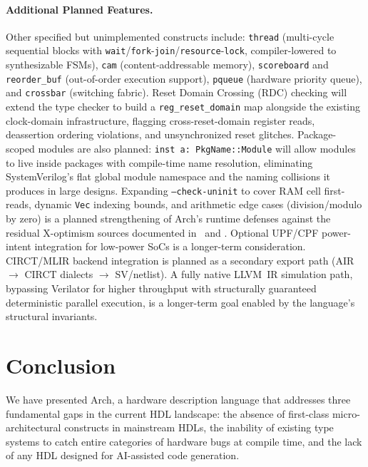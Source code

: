 \documentclass[11pt,twocolumn]{article}
\begin{document}
\paragraph{Additional Planned Features.}
Other specified but unimplemented constructs include:
\texttt{thread} (multi-cycle sequential blocks with \texttt{wait}/\texttt{fork}-\texttt{join}/\texttt{resource}-\texttt{lock}, compiler-lowered to synthesizable FSMs),
\texttt{cam} (content-addressable memory),
\texttt{scoreboard} and \texttt{reorder\_buf} (out-of-order execution support),
\texttt{pqueue} (hardware priority queue),
and \texttt{crossbar} (switching fabric).
Reset Domain Crossing (RDC) checking will extend the type checker to build a \texttt{reg\_reset\_domain} map alongside the existing clock-domain infrastructure, flagging cross-reset-domain register reads, deassertion ordering violations, and unsynchronized reset glitches.
Package-scoped modules are also planned: \texttt{inst a: PkgName::Module} will allow modules to live inside packages with compile-time name resolution, eliminating SystemVerilog's flat global module namespace and the naming collisions it produces in large designs.
Expanding \texttt{--check-uninit} to cover RAM cell first-reads, dynamic \texttt{Vec} indexing bounds, and arithmetic edge cases (division/modulo by zero) is a planned strengthening of Arch's runtime defenses against the residual X-optimism sources documented in~\cite{zhao2014xoptimism} and . Optional UPF/CPF power-intent integration for low-power SoCs is a longer-term consideration.
CIRCT/MLIR backend integration is planned as a secondary export path (AIR $\to$ CIRCT dialects $\to$ SV/netlist).
A fully native LLVM~IR simulation path, bypassing Verilator for higher throughput with structurally guaranteed deterministic parallel execution, is a longer-term goal enabled by the language's structural invariants.

\section{Conclusion}\label{sec:conclusion}

We have presented Arch, a hardware description language that addresses three fundamental gaps in the current HDL landscape: the absence of first-class micro-architectural constructs in mainstream HDLs, the inability of existing type systems to catch entire categories of hardware bugs at compile time, and the lack of any HDL designed for AI-assisted code generation.
\end{document}
